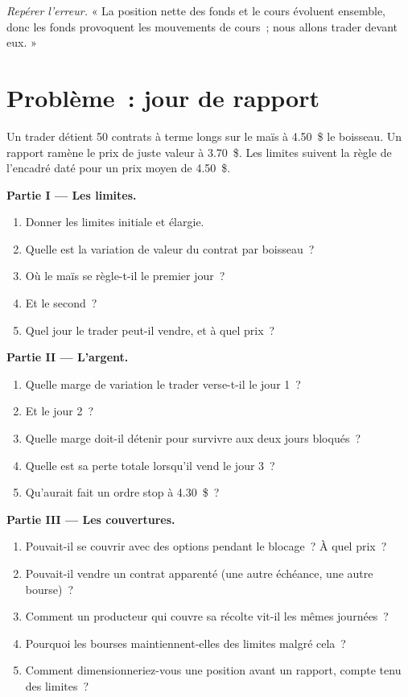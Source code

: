 \begin{exercise}[$\star\star\star$]\label{exo:m3:agriculturals-and-softs:8}
\emph{Repérer l'erreur.} « La position nette des fonds et le cours évoluent ensemble, donc les fonds provoquent les mouvements
de cours~; nous allons trader devant eux. »
\end{exercise}

\section{Problème~: jour de rapport}

\begin{problem}\label{pb:m3:agriculturals-and-softs:1}
Un trader détient 50 contrats à terme longs sur le maïs à 4.50~\$ le boisseau. Un rapport ramène le prix de juste valeur à 3.70~\$. Les limites
suivent la règle de l'encadré daté pour un prix moyen de 4.50~\$.

\medskip\noindent\textbf{Partie I --- Les limites.}
\begin{enumerate}
\item Donner les limites initiale et élargie.
\item Quelle est la variation de valeur du contrat par boisseau~?
\item Où le maïs se règle-t-il le premier jour~?
\item Et le second~?
\item Quel jour le trader peut-il vendre, et à quel prix~?
\end{enumerate}

\medskip\noindent\textbf{Partie II --- L'argent.}
\begin{enumerate}[resume]
\item Quelle marge de variation le trader verse-t-il le jour 1~?
\item Et le jour 2~?
\item Quelle marge doit-il détenir pour survivre aux deux jours bloqués~?
\item Quelle est sa perte totale lorsqu'il vend le jour 3~?
\item Qu'aurait fait un ordre stop à 4.30~\$~?
\end{enumerate}

\medskip\noindent\textbf{Partie III --- Les couvertures.}
\begin{enumerate}[resume]
\item Pouvait-il se couvrir avec des options pendant le blocage~? À quel prix~?
\item Pouvait-il vendre un contrat apparenté (une autre échéance, une autre bourse)~?
\item Comment un producteur qui couvre sa récolte vit-il les mêmes journées~?
\item Pourquoi les bourses maintiennent-elles des limites malgré cela~?
\item Comment dimensionneriez-vous une position avant un rapport, compte tenu des limites~?
\end{enumerate}


\end{problem}
